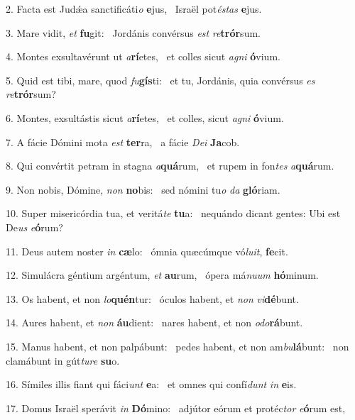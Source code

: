 2. Facta est Judǽa sanctificáti\textit{o} \textbf{e}jus, \ast\  Israël pot\textit{és}\textit{tas} \textbf{e}jus.\

3. Mare vidit, \textit{et} \textbf{fu}git: \ast\  Jordánis convérsus \textit{est} \textit{re}\textbf{trór}sum.\

4. Montes exsultavérunt ut \textit{a}\textbf{rí}etes, \ast\  et colles sicut \textit{a}\textit{gni} \textbf{ó}vium.\

5. Quid est tibi, mare, quod \textit{fu}\textbf{gís}ti: \ast\  et tu, Jordánis, quia convérsus \textit{es} \textit{re}\textbf{trór}sum?\

6. Montes, exsultástis sicut \textit{a}\textbf{rí}etes, \ast\  et colles, sicut \textit{a}\textit{gni} \textbf{ó}vium.\

7. A fácie Dómini mota \textit{est} \textbf{ter}ra, \ast\  a fácie \textit{De}\textit{i} \textbf{Ja}cob.\

8. Qui convértit petram in stagna \textit{a}\textbf{quá}rum, \ast\  et rupem in fon\textit{tes} \textit{a}\textbf{quá}rum.\

9. Non nobis, Dómine, \textit{non} \textbf{no}bis: \ast\  sed nómini tu\textit{o} \textit{da} \textbf{gló}riam.\

10. Super misericórdia tua, et veritá\textit{te} \textbf{tu}a: \ast\  nequándo dicant gentes: Ubi est De\textit{us} \textit{e}\textbf{ó}rum?\

11. Deus autem noster \textit{in} \textbf{cæ}lo: \ast\  ómnia quæcúmque vó\textit{lu}\textit{it}, \textbf{fe}cit.\

12. Simulácra géntium argéntum, \textit{et} \textbf{au}rum, \ast\  ópera má\textit{nu}\textit{um} \textbf{hó}minum.\

13. Os habent, et non \textit{lo}\textbf{quén}tur: \ast\  óculos habent, et \textit{non} \textit{vi}\textbf{dé}bunt.\

14. Aures habent, et \textit{non} \textbf{áu}dient: \ast\  nares habent, et non \textit{o}\textit{do}\textbf{rá}bunt.\

15. Manus habent, et non palpábunt: \dag\  pedes habent, et non am\textit{bu}\textbf{lá}bunt: \ast\  non clamábunt in gút\textit{tu}\textit{re} \textbf{su}o.\

16. Símiles illis fiant qui fáci\textit{unt} \textbf{e}a: \ast\  et omnes qui confí\textit{dunt} \textit{in} \textbf{e}is.\

17. Domus Israël sperávit \textit{in} \textbf{Dó}mino: \ast\  adjútor eórum et protéc\textit{tor} \textit{e}\textbf{ó}rum est,\

